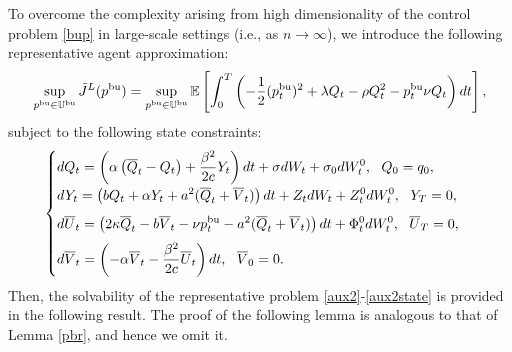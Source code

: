 \documentclass[11pt]{article}
\numberwithin{equation}{section}
\begin{document}
To overcome the complexity arising from high dimensionality of the control problem \eqref{bup} in large-scale settings (i.e., as $n \to \infty$), we introduce the following representative agent approximation:
	\begin{equation}\label{aux2}
		\sup_{p^{{\rm bu}}\in\mathbb{U}^{\rm bu}}\tilde{J}^L(p^{{\rm bu}})=\sup_{p^{{\rm bu}}\in\mathbb{U}^{\rm bu}}\mathbb{E}\left[\int_0^T\left(-\frac{1}{2}(p_t^{{\rm bu}})^2+\lambda Q_t-\rho Q_t^2-p_t^{{\rm bu}}\nu Q_t\right)dt\right],
	\end{equation}
	subject to the following state constraints:
	\begin{align}\label{aux2state}
		\begin{cases}
			\displaystyle dQ_t=\left(\alpha\left(\overline{Q}_t-Q_t\right)+\frac{\beta^2}{2c}Y_t\right)dt+\sigma dW_t+\sigma_0dW_t^0,~~Q_0=q_0,\\[0.6em]
			\displaystyle dY_t=\left(bQ_t+\alpha Y_t+a^2(\overline{Q}_t+\overline{V}_t)\right)dt+Z_tdW_t+Z_t^0dW_t^0,~~Y_T=0,\\[0.6em]
			\displaystyle d\overline{U}_t=\left(2\kappa \overline{Q}_t-b\overline{V}_t-\nu p_t^{{\rm bu}}-a^2(\overline{Q}_t+\overline{V}_t)\right)dt+\Phi_t^0dW_t^0,~~ \overline{U}_T=0,\\[0.6em]
			\displaystyle d\overline{V}_t=\left(-\alpha \overline{V}_t-\frac{\beta^2}{2c}\overline{U}_t\right)dt,~~\overline{V}_0=0.
		\end{cases}
	\end{align}
Then, the solvability of the representative problem \eqref{aux2}-\eqref{aux2state} is provided in the following result. The proof of the following lemma is analogous to that of Lemma \ref{pbr}, and hence we omit it.
\end{document}

